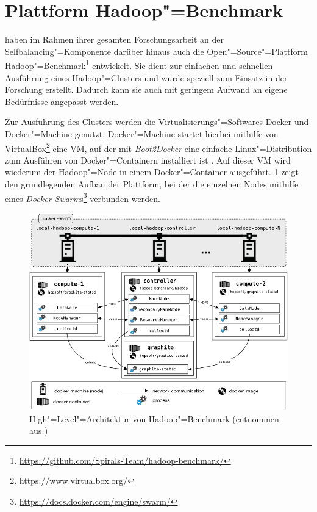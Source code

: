 \section{Plattform Hadoop"=Benchmark}
\label{sec:hadoopBenchmark}

\citeauthor{Zhang2016} haben im Rahmen ihrer gesamten Forschungsarbeit an der Selfbalancing"=Komponente darüber hinaus auch die Open"=Source"=Plattform Hadoop"=Benchmark\footnote{\url{https://github.com/Spirals-Team/hadoop-benchmark/}} entwickelt.
Sie dient zur einfachen und schnellen Ausführung eines Hadoop"=Clusters und wurde speziell zum Einsatz in der Forschung erstellt.
Dadurch kann sie auch mit geringem Aufwand an eigene Bedürfnisse angepasst werden.

Zur Ausführung des Clusters werden die Virtualisierungs"=Softwares Docker und Docker"=Machine genutzt.
Docker"=Machine startet hierbei mithilfe von VirtualBox\footnote{\url{https://www.virtualbox.org/}} eine VM, auf der mit \emph{Boot2Docker} eine einfache Linux"=Distribution zum Ausführen von Docker"=Containern installiert ist \cite{DockerMachineGettingStartedVm}.
Auf dieser VM wird wiederum der Hadoop"=Node in einem Docker"=Container ausgeführt.
\cref{fig:hadoopBenchmarkArchitecture} zeigt den grundlegenden Aufbau der Plattform, bei der die einzelnen Nodes mithilfe eines \emph{Docker  Swarm}s\footnote{\url{https://docs.docker.com/engine/swarm/}} verbunden werden.

\begin{figure}
    \includegraphics{./resources/hadoopBenchmarkArch.png}
    \caption[High"=Level"=Architektur von Hadoop"=Benchmark]
    {High"=Level"=Architektur von Hadoop"=Benchmark (entnommen aus \cite{abb:hadoopBenchmarkArch})}
    \label{fig:hadoopBenchmarkArchitecture}
\end{figure}

